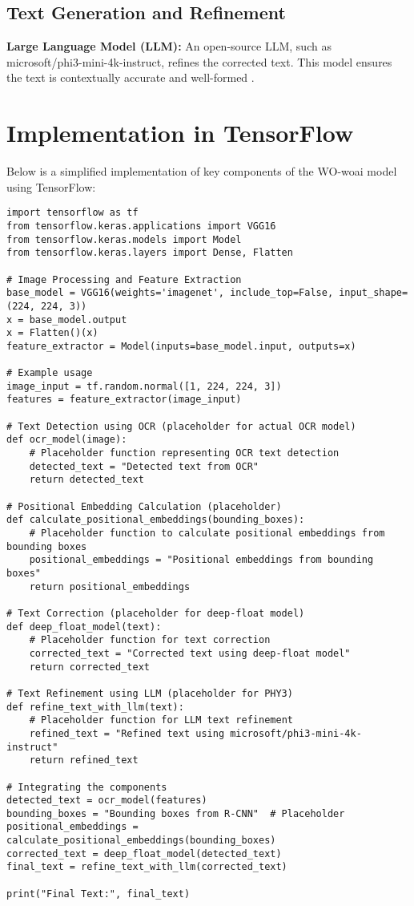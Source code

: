 \documentclass{article}
\begin{document}
\subsection{Text Generation and Refinement}
\textbf{Large Language Model (LLM):} An open-source LLM, such as microsoft/phi3-mini-4k-instruct, refines the corrected text. This model ensures the text is contextually accurate and well-formed \cite{Jianpeng2019}.

\section{Implementation in TensorFlow}
Below is a simplified implementation of key components of the WO-woai model using TensorFlow:
\begin{verbatim}
import tensorflow as tf
from tensorflow.keras.applications import VGG16
from tensorflow.keras.models import Model
from tensorflow.keras.layers import Dense, Flatten

# Image Processing and Feature Extraction
base_model = VGG16(weights='imagenet', include_top=False, input_shape=(224, 224, 3))
x = base_model.output
x = Flatten()(x)
feature_extractor = Model(inputs=base_model.input, outputs=x)

# Example usage
image_input = tf.random.normal([1, 224, 224, 3])
features = feature_extractor(image_input)

# Text Detection using OCR (placeholder for actual OCR model)
def ocr_model(image):
    # Placeholder function representing OCR text detection
    detected_text = "Detected text from OCR"
    return detected_text

# Positional Embedding Calculation (placeholder)
def calculate_positional_embeddings(bounding_boxes):
    # Placeholder function to calculate positional embeddings from bounding boxes
    positional_embeddings = "Positional embeddings from bounding boxes"
    return positional_embeddings

# Text Correction (placeholder for deep-float model)
def deep_float_model(text):
    # Placeholder function for text correction
    corrected_text = "Corrected text using deep-float model"
    return corrected_text

# Text Refinement using LLM (placeholder for PHY3)
def refine_text_with_llm(text):
    # Placeholder function for LLM text refinement
    refined_text = "Refined text using microsoft/phi3-mini-4k-instruct"
    return refined_text

# Integrating the components
detected_text = ocr_model(features)
bounding_boxes = "Bounding boxes from R-CNN"  # Placeholder
positional_embeddings = calculate_positional_embeddings(bounding_boxes)
corrected_text = deep_float_model(detected_text)
final_text = refine_text_with_llm(corrected_text)

print("Final Text:", final_text)
\end{verbatim}
\end{document}
